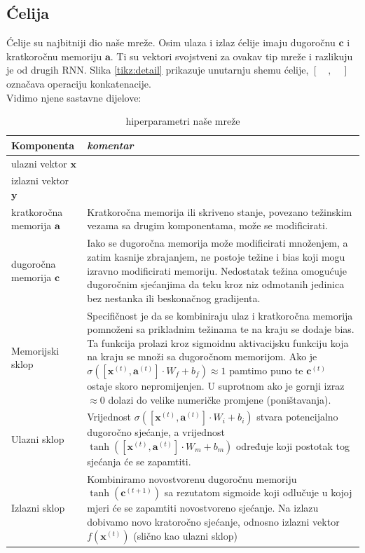 \documentclass[conference]{IEEEtran}
\begin{document}
\subsection{Ćelija}
Ćelije su najbitniji dio naše mreže. Osim ulaza i izlaz ćelije imaju dugoročnu $\mathbf{c}$ i kratkoročnu memoriju $\mathbf{a}$. Ti su vektori svojstveni za ovakav tip mreže i razlikuju je od drugih RNN. Slika \ref{tikz:detail} prikazuje unutarnju shemu ćelije, $[\quad, \quad]$ označava operaciju konkatenacije.
\ \\
Vidimo njene sastavne dijelove:
\begin{table}[htbp]
\caption{hiperparametri naše mreže}
\begin{center}
\begin{tabular}{|p{80pt}|p{140pt}|}
\hline
\textbf{Komponenta} & \textbf{\textit{komentar}}\\ \hline
ulazni vektor $\mathbf{x}$ & \\ \hline
izlazni vektor $\mathbf{y}$ & \\ \hline
kratkoročna memorija $\mathbf{a}$ & Kratkoročna memorija ili skriveno stanje, povezano težinskim vezama sa drugim komponentama, može se modificirati. \\ \hline
dugoročna memorija $\mathbf{c}$ & Iako se dugoročna memorija može modificirati množenjem, a zatim kasnije zbrajanjem, ne postoje težine i bias koji mogu izravno modificirati memoriju. Nedostatak težina omogućuje dugoročnim sjećanjima da teku kroz niz odmotanih jedinica bez nestanka ili beskonačnog gradijenta. \\ \hline
Memorijski sklop & Specifičnost je da se kombiniraju ulaz i kratkoročna memorija pomnoženi sa prikladnim težinama te na kraju se dodaje bias. Ta funkcija prolazi kroz sigmoidnu aktivacijsku funkciju koja na kraju se množi sa dugoročnom memorijom. Ako je $\sigma( [\mathbf{x}^{(t)}, \mathbf{a}^{(t)}] \cdot W_f + b_f) \approx 1 $ pamtimo puno te $\mathbf{c}^{(t)}$ ostaje skoro nepromijenjen. U suprotnom ako je gornji izraz $\approx 0$ dolazi do velike numeričke promjene (poništavanja). \\ \hline
Ulazni sklop &  Vrijednost $\sigma( [\mathbf{x}^{(t)}, \mathbf{a}^{(t)}] \cdot W_i + b_i)$ stvara potencijalno dugoročno sjećanje, a vrijednost $\tanh( [\mathbf{x}^{(t)}, \mathbf{a}^{(t)}] \cdot W_m + b_m)$ određuje koji postotak tog sjećanja će se zapamtiti. \\ \hline
Izlazni sklop & Kombiniramo novostvorenu dugoročnu memoriju $\tanh(\mathbf{c}^{(t+1)})$ sa rezutatom sigmoide koji odlučuje u kojoj mjeri će se zapamtiti novostvoreno sjećanje. Na izlazu dobivamo novo kratoročno sjećanje, odnosno izlazni vektor $f(\mathbf{x}^{(t)})$ (slično kao ulazni sklop) \\ \hline
\end{tabular}
\label{tab:hiper}
\end{center}
\end{table}
\end{document}
